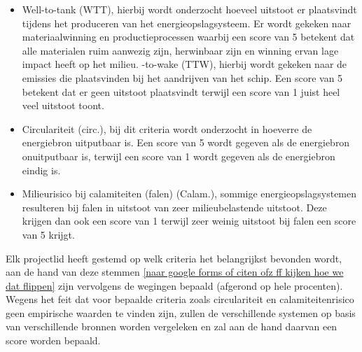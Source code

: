 \begin{itemize}
    \item Well-to-tank (WTT), hierbij wordt onderzocht hoeveel uitstoot er plaatsvindt tijdens het produceren van het energieopslagsysteem. Er wordt gekeken naar materiaalwinning en productieprocessen waarbij een score van 5 betekent dat alle materialen ruim aanwezig zijn, herwinbaar zijn en winning ervan lage impact heeft op het milieu. 
    \itemTank-to-wake (TTW), hierbij wordt gekeken naar de emissies die plaatsvinden bij het aandrijven van het schip. Een score van 5 betekent dat er geen uitstoot plaatsvindt terwijl een score van 1 juist heel veel uitstoot toont.
    \item Circulariteit (circ.), bij dit criteria wordt onderzocht in hoeverre de energiebron uitputbaar is. Een score van 5 wordt gegeven als de energiebron onuitputbaar is, terwijl een score van 1 wordt gegeven als de energiebron eindig is. 
    \item Milieurisico bij calamiteiten (falen) (Calam.), sommige energieopslagsystemen resulteren bij falen in uitstoot van zeer milieubelastende uitstoot. Deze krijgen dan ook een score van 1 terwijl zeer weinig uitstoot bij falen een score van 5 krijgt.
\end{itemize}

\noindent Elk projectlid heeft gestemd op welk criteria het belangrijkst bevonden wordt, aan de hand van deze stemmen \ref{naar google forms of citen ofz ff kijken hoe we dat flippen} zijn vervolgens de wegingen bepaald (afgerond op hele procenten). Wegens het feit dat voor bepaalde criteria zoals circulariteit en calamiteitenrisico geen empirische waarden te vinden zijn, zullen de verschillende systemen op basis van verschillende bronnen worden vergeleken en zal aan de hand daarvan een score worden bepaald. 

